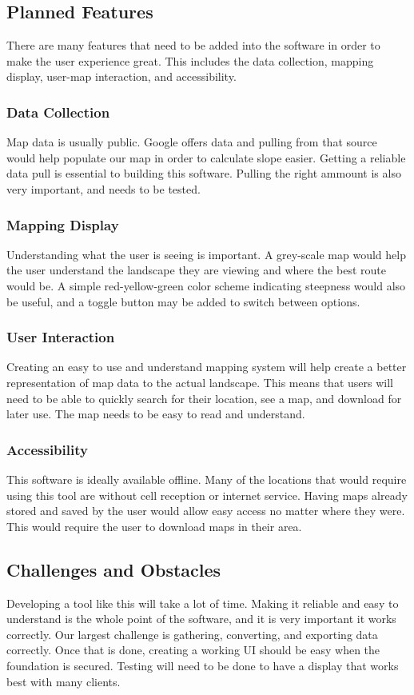 \documentclass[12pt]{article}
\begin{document}
\subsection{Planned Features}
There are many features that need to be added into the software in order to make the user experience great. This includes the data collection, mapping display, user-map interaction, and accessibility.
\subsubsection{Data Collection}
Map data is usually public. Google offers data and pulling from that source would help populate our map in order to calculate slope easier. Getting a reliable data pull is essential to building this software. Pulling the right ammount is also very important, and needs to be tested.
\subsubsection{Mapping Display}
Understanding what the user is seeing is important. A grey-scale map would help the user understand the landscape they are viewing and where the best route would be. A simple red-yellow-green color scheme indicating steepness would also be useful, and a toggle button may be added to switch between options.
\subsubsection{User Interaction}
Creating an easy to use and understand mapping system will help create a better representation of map data to the actual landscape. This means that users will need to be able to quickly search for their location, see a map, and download for later use. The map needs to be easy to read and understand.
\subsubsection{Accessibility}
This software is ideally available offline. Many of the locations that would require using this tool are without cell reception or internet service. Having maps already stored and saved by the user would allow easy access no matter where they were. This would require the user to download maps in their area.
\subsection{Challenges and Obstacles}
Developing a tool like this will take a lot of time. Making it reliable and easy to understand is the whole point of the software, and it is very important it works correctly. Our largest challenge is gathering, converting, and exporting data correctly. Once that is done, creating a working UI should be easy when the foundation is secured. Testing will need to be done to have a display that works best with many clients. 


\end{document}
